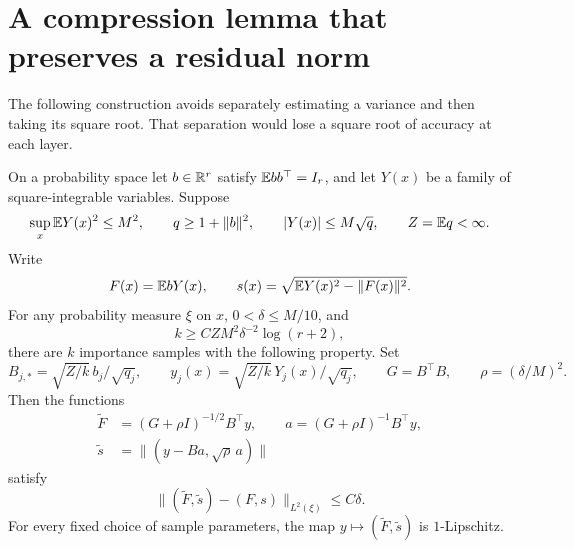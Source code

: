 \section{A compression lemma that preserves a residual norm}
\label{sec:sampling}
The following construction avoids separately estimating a variance and then taking its square root. That separation would lose a square root of accuracy at each layer.

\begin{lemma}
\label{lem:sampling}
On a probability space let $b\in\mathbb R^r$ satisfy $\mathbb E bb^\top=I_r$, and let $Y(x)$ be a family of square-integrable variables. Suppose
\[
 \sup_x\mathbb E Y(x)^2\le M^2,\qquad
 q\ge1+\|b\|^2,\qquad |Y(x)|\le M\sqrt q,\qquad Z=\mathbb E q<\infty.
\]
Write
\[
 F(x)=\mathbb E bY(x),\qquad s(x)=\sqrt{\mathbb E Y(x)^2-\|F(x)\|^2}.
\]
For any probability measure $\xi$ on $x$, $0<\delta\le M/10$, and
\[
 k\ge C ZM^2\delta^{-2}\log(r+2),
\]
there are $k$ importance samples with the following property. Set
\[
 B_{j,*}=\sqrt{Z/k}\,b_j/\sqrt{q_j},\qquad
 y_j(x)=\sqrt{Z/k}\,Y_j(x)/\sqrt{q_j},\qquad
 G=B^\top B,\qquad \rho=(\delta/M)^2.
\]
Then the functions
\begin{align}
 \widetilde F&=(G+\rho I)^{-1/2}B^\top y,\qquad
 a=(G+\rho I)^{-1}B^\top y,\\
 \widetilde s&=\|(y-Ba,\sqrt\rho\,a)\|
 \label{eq:sampled-pair}
\end{align}
satisfy
\[
 \|(\widetilde F,\widetilde s)-(F,s)\|_{L^2(\xi)}\le C\delta.
\]
For every fixed choice of sample parameters, the map $y\mapsto(\widetilde F,\widetilde s)$ is $1$-Lipschitz.
\end{lemma}

